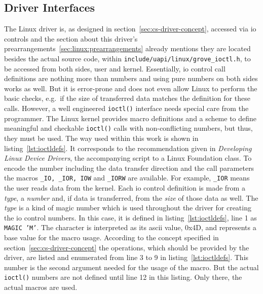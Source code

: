 \subsection{Driver Interfaces}
The Linux driver is, as designed in section~\ref{sec:cs-driver-concept}, accessed via \ac{io} controls and the section about this driver's prearrangements~\ref{sec:linux:prearrangements} already mentions they are located besides the actual source code, within \texttt{include/uapi/linux/grove\_ioctl.h}, to be accessed from both sides, user and kernel.
Essentially, \ac{io} control call definitions are nothing more than numbers and using pure numbers on both sides works as well.
But it is error-prone and does not even allow Linux to perform the basic checks, e.g.\ if the size of transferred data matches the definition for these calls.
However, a well engineered \texttt{ioctl()} interface needs special care from the programmer.
The Linux kernel provides macro definitions and a scheme to define meaningful and checkable \texttt{ioctl()} calls with non-conflicting numbers, but thus, they must be used.
The way used within this work is shown in listing~\ref{lst:ioctldefs}.
It corresponds to the recommendation given in \textit{Developing Linux Device Drivers}\cite{lfd430}, the accompanying script to a Linux Foundation class.
To encode the number including the data transfer direction and the call parameters the macros \texttt{_IO, _IOR, IOW} and \texttt{_IORW} are available.
For example, \texttt{_IOR} means the user reads data from the kernel.
Each \ac{io} control definition is made from a \textit{type}, a \textit{number} and, if data is transferred, from the \textit{size} of those data as well. 
The \textit{type} is a kind of magic number which is used throughout the driver for creating the \ac{io} control numbers.
In this case, it is defined in listing~\ref{lst:ioctldefs}, line 1 as \texttt{MAGIC 'M'}.
The character is interpreted as its \ac{ascii} value, 0x4D, and represents a base value for the macro usage.
According to the concept specified in section~\ref{sec:cs-driver-concept} the operations, which should be provided by the driver, are listed and enumerated from line 3 to 9 in listing~\ref{lst:ioctldefs}.
This number is the second argument needed for the usage of the macro.
But the actual \texttt{ioctl()} numbers are not defined until line 12 in this listing.
Only there, the actual macros are used.
%
